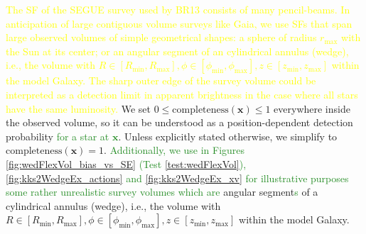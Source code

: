\documentclass[iop,revtex4,numberedappendix,appendixfloats]{emulateapj}
\newcommand{\vect}[1]{\boldsymbol{#1}}
\newcommand{\NEW}[1]{\textcolor{ForestGreen}{#1}}
\newcommand{\OLD}[1]{\textcolor{Yellow}{#1}}%
\begin{document}
\OLD{The SF of the SEGUE survey \citep{2012ApJ...753..148B} used by BR13 consists of many pencil-beams. In anticipation of large contiguous volume surveys like Gaia, we use SFs that span large observed volumes of simple geometrical shapes: a sphere of radius $r_\text{max}$ with the Sun at its center; or an angular segment of an cylindrical annulus (wedge), i.e., the volume with $R \in [R_\text{min},R_\text{max}],\phi \in [\phi_\text{min},\phi_\text{max}],z \in [z_\text{min},z_\text{max}]$ within the model Galaxy. The sharp outer edge of the survey volume could be interpreted as a detection limit in apparent brightness in the case where all stars have the same luminosity.} We set $0 \leq \text{completeness}(\vect{x}) \leq 1$ everywhere inside the observed volume, so it can be understood as a position-dependent detection probability \NEW{for a star at $\vect{x}$}. Unless explicitly stated otherwise, we simplify to $\text{completeness}(\vect{x}) = 1$. \NEW{Additionally, we use in Figures \ref{fig:wedFlexVol_bias_vs_SE} (Test \ref{test:wedFlexVol}), \ref{fig:kks2WedgeEx_actions} and \ref{fig:kks2WedgeEx_xv} for illustrative purposes some rather unrealistic survey volumes which are} angular segment\NEW{s} of a cylindrical annulus (wedge), i.e., the volume with $R \in [R_\text{min},R_\text{max}],\phi \in [\phi_\text{min},\phi_\text{max}],z \in [z_\text{min},z_\text{max}]$ within the model Galaxy. 

\end{document}
